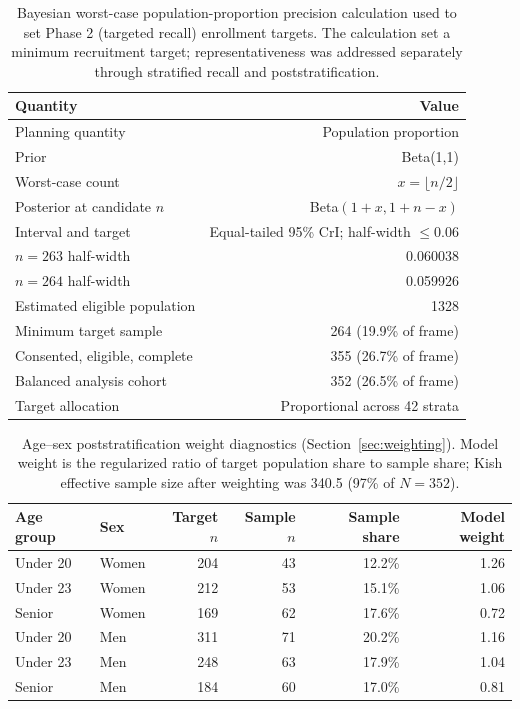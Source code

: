\begin{table}[htbp]
\centering
\caption{Bayesian worst-case population-proportion precision calculation used to set Phase 2 (targeted recall) enrollment targets. The calculation set a minimum recruitment target; representativeness was addressed separately through stratified recall and poststratification.}
\label{tab:sample-size}
\begin{tabular}{lr}
\toprule
Quantity & Value \\
\midrule
Planning quantity & Population proportion \\
Prior & Beta(1,1) \\
Worst-case count & $x=\lfloor n/2\rfloor$ \\
Posterior at candidate $n$ & Beta$(1+x,1+n-x)$ \\
Interval and target & Equal-tailed 95\% CrI; half-width $\leq 0.06$ \\
$n=263$ half-width & 0.060038 \\
$n=264$ half-width & 0.059926 \\
Estimated eligible population & 1328 \\
Minimum target sample & 264 (19.9\% of frame) \\
Consented, eligible, complete & 355 (26.7\% of frame) \\
Balanced analysis cohort & 352 (26.5\% of frame) \\
Target allocation & Proportional across 42 strata \\
\bottomrule
\end{tabular}
\end{table}

\begin{table}[htbp]
\centering
\caption{Age--sex poststratification weight diagnostics (Section~\ref{sec:weighting}). Model weight is the regularized ratio of target population share to sample share; Kish effective sample size after weighting was 340.5 (97\% of $N=352$).}
\label{tab:weight-diagnostics}
\begin{tabular}{llrrrr}
\toprule
Age group & Sex & Target $n$ & Sample $n$ & Sample share & Model weight \\
\midrule
Under 20 & Women & 204 & 43 & 12.2\% & 1.26 \\
Under 23 & Women & 212 & 53 & 15.1\% & 1.06 \\
Senior & Women & 169 & 62 & 17.6\% & 0.72 \\
Under 20 & Men & 311 & 71 & 20.2\% & 1.16 \\
Under 23 & Men & 248 & 63 & 17.9\% & 1.04 \\
Senior & Men & 184 & 60 & 17.0\% & 0.81 \\
\bottomrule
\end{tabular}
\end{table}

